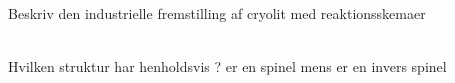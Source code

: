 \begin{flashcard}[Fremstilling]{Beskriv den industrielle fremstilling af cryolit med reaktionsskemaer}
\\
\\ \vspace{7pt}
\end{flashcard}

\begin{flashcard}[Struktur]{Hvilken struktur har  henholdsvis ?}
 er en spinel mens  er en invers spinel
\end{flashcard}